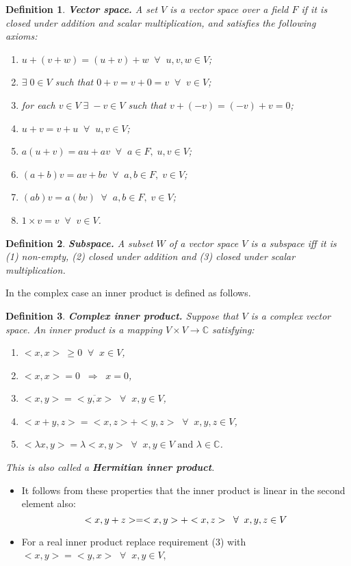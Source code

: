 \documentclass[two column]{article}
\newtheorem{definition}{Definition}[subsection]
\begin{document}
\begin{definition}
{\bf Vector space.} A set $V$ is a vector space over a field $F$ if it is closed under addition and scalar multiplication, and satisfies the following axioms:
\begin{enumerate}
\item $u + (v + w) = (u + v) + w \;\; \forall \;\; u,v,w \in V$;
\item $\exists \; 0 \in V$ such that $0 + v = v + 0 = v \;\; \forall \;\; v \in V$;
\item for each $v \in V \; \exists \; -v \in V$ such that $v + (-v) = (-v) + v = 0$; 
\item $u + v = v + u \;\; \forall \;\; u,v \in V$;
\item $a(u + v) = au + av \;\; \forall \;\; a \in F, \; u,v \in V$; 
\item $(a + b)v = av + bv \;\; \forall \;\; a,b \in F, \; v \in V$; 
\item $(ab)v = a(bv) \;\; \forall \;\; a,b \in F, \; v \in V$;
\item $1\times v = v \;\; \forall \;\; v \in V$. \\
\end{enumerate}
\end{definition}

\begin{definition}
{\bf Subspace.} A subset $W$ of a vector space $V$ is a subspace iff it is (1) non-empty, (2) closed under addition and (3) closed under scalar multiplication. 
\end{definition}

In the complex case an inner product is defined as follows.\\

\begin{definition}
{\bf Complex inner product.} Suppose that $V$ is a complex vector space. An inner product is a mapping $V \times V \rightarrow \mathbb{C}$ satisfying:
\begin{enumerate}
\item $< x,x > \: \geq 0 \;\; \forall \;\; x \in V$,
\item $< x,x > = 0 \;\; \Rightarrow \;\; x = 0$,
\item $< x,y > = \overline{< y,x >} \;\; \forall \;\; x,y \in V$, 
\item $< x+y,z > = < x,z > + < y,z > \;\; \forall \;\; x,y,z \in V$,
\item $< \lambda x,y > = \lambda< x,y > \;\; \forall \;\; x,y \in V \text{ and } \lambda \in \mathbb{C}$. 
\end{enumerate}
This is also called a {\bf Hermitian inner product}. 
\end{definition}
\begin{itemize}
\item It follows from these properties that the inner product is linear in the second element also: \vspace{-10pt}
\[ < x,y+z > = < x,y > + < x,z > \;\; \forall \;\; x,y,z \in V \vspace{-10pt} \]
\item For a real inner product replace requirement (3) with $< x,y > = < y,x > \;\; \forall \;\; x,y \in V$, 
\end{itemize}
\end{document}
